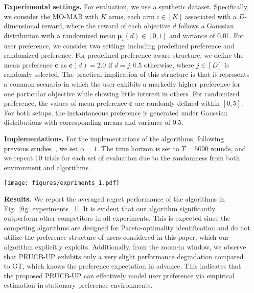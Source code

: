 \textbf{Experimental settings.}
For evaluation, we use a synthetic dataset. Specifically, we consider the MO-MAB with $K$ arms, each arm $i \in [K]$ associated with a $D$-dimensional reward, where the reward of each objective $d$ follows a Gaussian distribution with a randomized mean $\boldsymbol{\mu}_i(d) \in [0,1]$ and variance of 0.01.
For user preference, we consider two settings including predefined preference and randomized preference. For predefined preference-aware structure, we define the mean preference $\boldsymbol{\overline{c}}$ as 
$ \boldsymbol{\overline{c}}(d) = 
2.0 \text{ if } d=j; 0.5 \text{ otherwise}
$, 
where $j \in [D]$ is randomly selected. The practical implication of this structure is that it represents a common scenario in which the user exhibits a markedly higher preference for one particular objective while showing little interest in others.
For randomized preference, the values of mean preference $\boldsymbol{\overline{c}}$ are randomly defined within $[0,5]$. For both setups, the instantaneous preference is generated under Gaussian distributions with corresponding means and variance of 0.5. 

\textbf{Implementations.}
For the implementations of the algorithms, following previous studies~\cite{auer2002finite, audibert2007tuning}, we set $\alpha=1$.
The time horizon is set to $T = 5000$ rounds, and we repeat 10 trials for each set of evaluation due to the randomness from both environment and algorithms.

\begin{figure*}[ht]
    \centering    
    \texttt{[image: figures/expriments\_1.pdf]}
    \caption{Regrets of different algorithms under unknown preference environment. 
}
\label{fig: experiments_1}
\end{figure*}


\textbf{Results.}
We report the averaged regret performance of the algorithms in Fig.~\ref{fig: experiments_1}.
It is evident that our algorithm significantly outperform other competitors in all experiments. This is expected since the competing algorithms are designed for Pareto-optimality identification and do not utilize the preference structure of users considered in this paper, which our algorithm explicitly exploits.
Additionally, from the zoom-in window, we observe that PRUCB-UP exhibits only a very slight performance degradation compared to GT, which knows the preference expectation in advance. This indicates that the proposed PRUCB-UP can effectively model user preference via empirical estimation in stationary preference environments.






